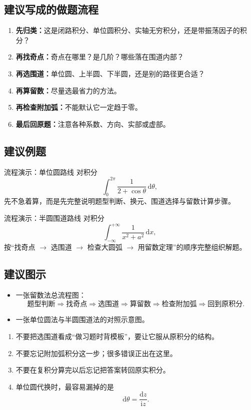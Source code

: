 \subsection*{建议写成的做题流程}
\begin{enumerate}
    \item \textbf{先归类：}这是闭路积分、单位圆积分、实轴无穷积分，还是带振荡因子的积分？
    \item \textbf{再找奇点：}奇点在哪里？是几阶？哪些落在围道内部？
    \item \textbf{再选围道：}单位圆、上半圆、下半圆，还是别的路径更合适？
    \item \textbf{再算留数：}尽量选最省力的方法。
    \item \textbf{再检查附加弧：}不能默认它一定趋于零。
    \item \textbf{最后回原题：}注意各种系数、方向、实部或虚部。
\end{enumerate}

\subsection*{建议例题}
\begin{lizi}{流程演示：单位圆路线}{}
对积分
\[
    \int_0^{2\pi}\frac{1}{2+\cos\theta}\,\mathrm{d}\theta,
\]
先不急着算，而是先完整说明题型判断、换元、围道选择与留数计算步骤。
\end{lizi}

\begin{lizi}{流程演示：半圆围道路线}{}
对积分
\[
    \int_{-\infty}^{+\infty}\frac{1}{x^2+a^2}\,\mathrm{d}x,
\]
按``找奇点 $\to$ 选围道 $\to$ 检查大圆弧 $\to$ 用留数定理''的顺序完整组织解题。
\end{lizi}

\subsection*{建议图示}
\begin{itemize}
    \item 一张留数法总流程图：
    \[
        \text{题型判断}
        \Longrightarrow
        \text{找奇点}
        \Longrightarrow
        \text{选围道}
        \Longrightarrow
        \text{算留数}
        \Longrightarrow
        \text{检查附加弧}
        \Longrightarrow
        \text{回到原积分}.
    \]
    \item 一张单位圆法与半圆围道法的对照示意图。
\end{itemize}

\begin{jinshi}[本节易错点]
\begin{enumerate}
    \item 不要把选围道看成``做习题时背模板''，要让它服从原积分的结构。
    \item 不要忘记附加弧积分这一步；很多错误正出在这里。
    \item 不要在复积分算完以后忘记把答案转回原实积分。
    \item 单位圆代换时，最容易漏掉的是
    \[
        \mathrm{d}\theta=\frac{\mathrm{d}z}{\mathrm{i}z}.
    \]
\end{enumerate}
\end{jinshi}


